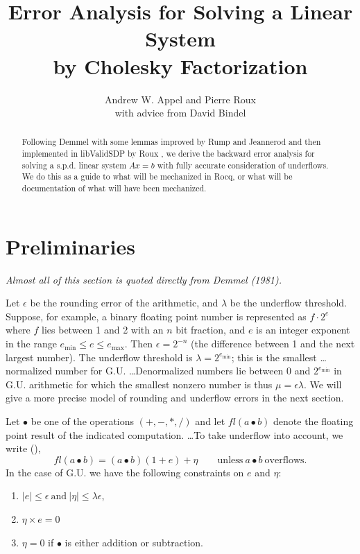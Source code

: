 \documentclass[a4paper]{article}
\title{Error Analysis for Solving a Linear System \\ by Cholesky Factorization}
\author{Andrew W. Appel and Pierre Roux\\
with advice from David Bindel}
\begin{document}
\maketitle

\begin{abstract}
  Following Demmel \cite{demmel81} with some lemmas improved by Rump and Jeannerod
\cite{rump14}
  and then implemented in libValidSDP by Roux \cite{DBLP:journals/jar/Roux16}, we derive
  the backward error analysis for solving a s.p.d. linear system $Ax=b$
  with fully accurate consideration of underflows.  We do this as a guide
  to what will be mechanized in Rocq, or what will be documentation of
  what will have been mechanized.
  \end{abstract}

\section{Preliminaries}

\emph{Almost all of this section is quoted directly from Demmel (1981).}

Let $\epsilon$ be the rounding error of the arithmetic, and $\lambda$ be the
underflow threshold.  Suppose, for example, a binary floating point number is
represented as $f\cdot 2^e$ where $f$ lies between 1 and 2 with an $n$ bit fraction,
and $e$ is an integer exponent in the range $e_\mathrm{min} \le e \le e_\mathrm{max}$.
Then $\epsilon=2^{-n}$ (the difference between 1 and the next largest number).
The underflow threshold is $\lambda=2^{e_\mathrm{min}}$; this is the smallest \ldots
normalized number for G.U. \ldots Denormalized numbers lie between 0 and $2^{e_\mathrm{min}}$
in G.U. arithmetic for which the smallest nonzero number is thus $\mu = \epsilon \lambda$.
We will give a more precise model of rounding and underflow errors in the next section.

\newcommand\fl[1]{\ensuremath{\mathit{fl}(#1)}}

Let $\bullet$ be one of the operations $(+,-,\ast,/)$ and let
$\fl{a \bullet b}$ denote the floating point result of the indicated
computation. \ldots To take underflow into account, we write
(\cite{10.1145/1057520.1057522}),
\begin{equation}\tag{11}
\fl{a \bullet b} = (a \bullet b)(1 + e)+\eta\qquad
\mathrm{unless}~a\bullet b ~\mathrm{overflows.}
\end{equation}
In the case of G.U. we have the following constraints on $e$ and $\eta$:
\begin{enumerate}
\item[(1)] $|e|\le \epsilon ~\mathrm{and}~ |\eta|\le \lambda \epsilon$,
\item[(2)] $\eta \times e = 0$
\item[(3)] $\eta=0$ if $\bullet$ is either addition or subtraction.
\end{enumerate}
\end{document}
